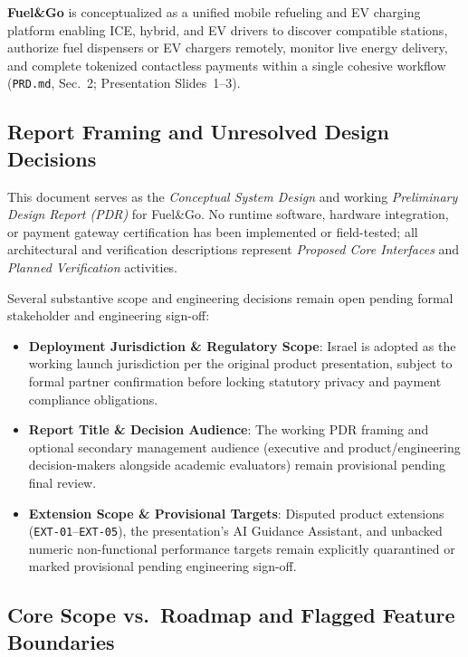 \textbf{Fuel\&Go} is conceptualized as a unified mobile refueling and EV charging platform enabling ICE, hybrid, and EV drivers to discover compatible stations, authorize fuel dispensers or EV chargers remotely, monitor live energy delivery, and complete tokenized contactless payments within a single cohesive workflow (\texttt{PRD.md}, Sec.~2; Presentation Slides~1--3).

\subsection{Report Framing and Unresolved Design Decisions}
\label{sec:intro-framing}

This document serves as the \emph{Conceptual System Design} and working \emph{Preliminary Design Report (PDR)} for Fuel\&Go. No runtime software, hardware integration, or payment gateway certification has been implemented or field-tested; all architectural and verification descriptions represent \emph{Proposed Core Interfaces} and \emph{Planned Verification} activities.

Several substantive scope and engineering decisions remain open pending formal stakeholder and engineering sign-off:
\begin{itemize}[leftmargin=1.4em, itemsep=2pt]
  \item \textbf{Deployment Jurisdiction \& Regulatory Scope}: Israel is adopted as the working launch jurisdiction per the original product presentation, subject to formal partner confirmation before locking statutory privacy and payment compliance obligations.
  \item \textbf{Report Title \& Decision Audience}: The working PDR framing and optional secondary management audience (executive and product/engineering decision-makers alongside academic evaluators) remain provisional pending final review.
  \item \textbf{Extension Scope \& Provisional Targets}: Disputed product extensions (\texttt{EXT-01}--\texttt{EXT-05}), the presentation's AI Guidance Assistant, and unbacked numeric non-functional performance targets remain explicitly quarantined or marked provisional pending engineering sign-off.
\end{itemize}

\subsection{Core Scope vs.\ Roadmap and Flagged Feature Boundaries}
\label{sec:intro-scope}

